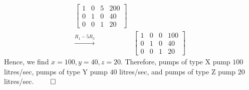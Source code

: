\documentclass[12pt, a4paper]{article}
\begin{document}
\begin{enumerate}[Q\arabic*.]
\begin{enumerate}[(\alph*)]
\begin{align*}
\begin{bmatrix}
            1&0&5&200\\
            0&1&0&40\\
            0&0&1&20
          \end{bmatrix}\\\xrightarrow{R_1-5R_3}
          &\begin{bmatrix}
            1&0&0&100\\
            0&1&0&40\\
            0&0&1&20
          \end{bmatrix}
        \end{align*}
      Hence, we find $x = 100, y = 40, z = 20$. Therefore, pumps of type X pump $100$ litres/sec, pumps of type Y pump $40$ litres/sec, and pumps of type Z pump $20$ litres/sec. $\qed$
    \end{enumerate}
    \pagebreak


\end{enumerate}
\end{document}
